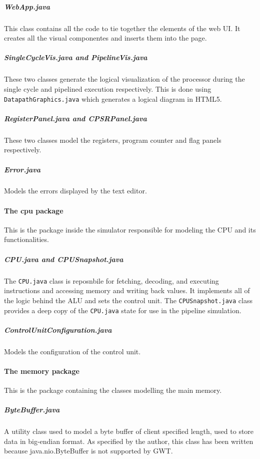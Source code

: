 \subparagraph*{WebApp.java}

This class contains all the code to tie together the elements of the web UI. It creates all the visual componentes and inserts them into the page.

\subparagraph*{SingleCycleVis.java and PipelineVis.java}

These two classes generate the logical visualization of the processor during the single cycle and pipelined execution respectively. This is done using \verb|DatapathGraphics.java| which generates a logical diagram in HTML5.

\subparagraph*{RegisterPanel.java and CPSRPanel.java}

These two classes model the registers, program counter and flag panels respectively.

\subparagraph*{Error.java}

Models the errors displayed by the text editor.

\paragraph*{The cpu package}

This is the package inside the simulator responsible for modeling the CPU and its functionalities.

\subparagraph*{CPU.java and CPUSnapshot.java}

The \verb|CPU.java| class is reposnbile for fetching, decoding, and executing instructions and accessing memory and writing back values. It implements all of the logic behind the ALU and sets the control unit. The \verb|CPUSnapshot.java| class provides a deep copy of the \verb|CPU.java| state for use in the pipeline simulation.

\subparagraph*{ControlUnitConfiguration.java} 

Models the configuration of the control unit.

\paragraph*{The memory package}

This is the package containing the classes modelling the main memory.

\subparagraph*{ByteBuffer.java}

A utility class used to model a byte buffer of client specified length, used to store data in big-endian format. As specified by the author, this class has been written because java.nio.ByteBuffer is not supported by GWT.

